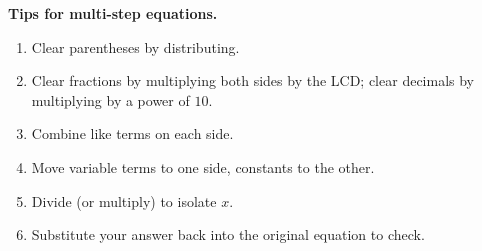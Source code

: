 \documentclass[11pt]{article}
\begin{document}
\bigskip
\noindent\textbf{Tips for multi-step equations.}
\begin{enumerate}[label=\arabic*., leftmargin=2em, itemsep=2pt, topsep=2pt]
  \item Clear parentheses by distributing.
  \item Clear fractions by multiplying both sides by the LCD; clear decimals by multiplying by a power of $10$.
  \item Combine like terms on each side.
  \item Move variable terms to one side, constants to the other.
  \item Divide (or multiply) to isolate $x$.
  \item Substitute your answer back into the original equation to check.
\end{enumerate}
\end{document}
